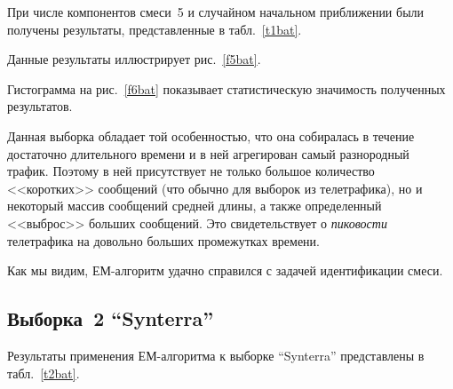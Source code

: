 \begin{multicols}{2}
При числе компонентов смеси~5 и случайном начальном приближении
были получены результаты, представленные в табл.~\ref{t1bat}.


Данные результаты иллюстрирует рис.~\ref{f5bat}.

Гистограмма  на рис.~\ref{f6bat} показывает статистическую значимость
полученных результатов.

Данная выборка обладает той особенностью, что она собиралась в течение
достаточно длительного времени и в ней агрегирован самый разнородный
трафик. Поэтому в ней присутствует не только большое количество
<<коротких>> сообщений (что обычно для выборок из телетрафика), но и
некоторый массив сообщений средней длины, а также определенный
<<выброс>> больших сообщений. Это свидетельствует о \textit{пиковости}
телетрафика на довольно больших промежутках времени.

Как мы видим, ЕМ-алгоритм удачно справился с задачей идентификации
смеси.

\subsection{Выборка~2 ``Synterra''} %

Результаты применения ЕМ-алгоритма к выборке ``Synterra''
представлены в табл.~\ref{t2bat}.
\begin{table*}\small
\begin{minipage}[t]{76mm}
\begin{center}
 \vspace*{2ex}


\end{center}
\end{minipage}
\end{table*}
\end{multicols}
